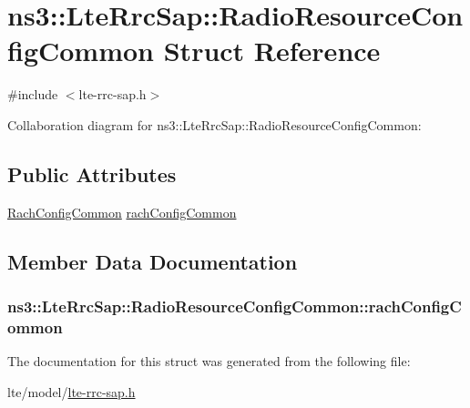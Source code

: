 \hypertarget{structns3_1_1LteRrcSap_1_1RadioResourceConfigCommon}{}\section{ns3\+:\+:Lte\+Rrc\+Sap\+:\+:Radio\+Resource\+Config\+Common Struct Reference}
\label{structns3_1_1LteRrcSap_1_1RadioResourceConfigCommon}


{\ttfamily \#include $<$lte-\/rrc-\/sap.\+h$>$}



Collaboration diagram for ns3\+:\+:Lte\+Rrc\+Sap\+:\+:Radio\+Resource\+Config\+Common\+:
\subsection*{Public Attributes}
\begin{DoxyCompactItemize}
\item 
\hyperlink{structns3_1_1LteRrcSap_1_1RachConfigCommon}{Rach\+Config\+Common} \hyperlink{structns3_1_1LteRrcSap_1_1RadioResourceConfigCommon_a01ff40d4f4e5d14194c7575651b375d6}{rach\+Config\+Common}
\end{DoxyCompactItemize}


\subsection{Member Data Documentation}
\subsubsection[{\texorpdfstring{rach\+Config\+Common}{rachConfigCommon}}]{ ns3\+::\+Lte\+Rrc\+Sap\+::\+Radio\+Resource\+Config\+Common\+::rach\+Config\+Common}\hypertarget{structns3_1_1LteRrcSap_1_1RadioResourceConfigCommon_a01ff40d4f4e5d14194c7575651b375d6}{}\label{structns3_1_1LteRrcSap_1_1RadioResourceConfigCommon_a01ff40d4f4e5d14194c7575651b375d6}


The documentation for this struct was generated from the following file\+:\begin{DoxyCompactItemize}
\item 
lte/model/\hyperlink{lte-rrc-sap_8h}{lte-\/rrc-\/sap.\+h}\end{DoxyCompactItemize}
